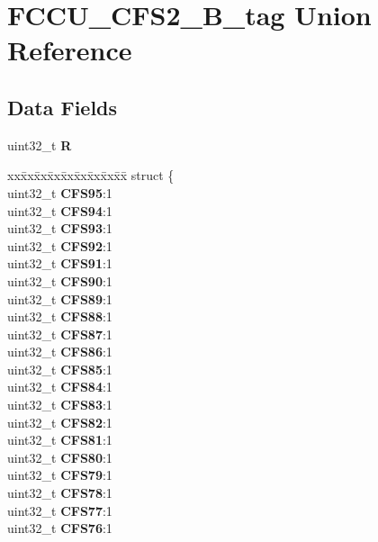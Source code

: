 \hypertarget{unionFCCU__CFS2__32B__tag}{}\section{F\+C\+C\+U\+\_\+\+C\+F\+S2\+\_\+B\+\_\+tag Union Reference}
\label{unionFCCU__CFS2__32B__tag}
\subsection*{Data Fields}
\begin{DoxyCompactItemize}
\item 
\mbox{\label{unionFCCU__CFS2__32B__tag_a33751eeab86018dc3710e349909c5fef}} 
uint32\+\_\+t {\bfseries R}
\item 
\mbox{\label{unionFCCU__CFS2__32B__tag_a234fdc9258a120998be7bef80231754e}} 
\begin{tabbing}
xx\=xx\=xx\=xx\=xx\=xx\=xx\=xx\=xx\=\kill
struct \{\\
\>uint32\_t {\bfseries CFS95}:1\\
\>uint32\_t {\bfseries CFS94}:1\\
\>uint32\_t {\bfseries CFS93}:1\\
\>uint32\_t {\bfseries CFS92}:1\\
\>uint32\_t {\bfseries CFS91}:1\\
\>uint32\_t {\bfseries CFS90}:1\\
\>uint32\_t {\bfseries CFS89}:1\\
\>uint32\_t {\bfseries CFS88}:1\\
\>uint32\_t {\bfseries CFS87}:1\\
\>uint32\_t {\bfseries CFS86}:1\\
\>uint32\_t {\bfseries CFS85}:1\\
\>uint32\_t {\bfseries CFS84}:1\\
\>uint32\_t {\bfseries CFS83}:1\\
\>uint32\_t {\bfseries CFS82}:1\\
\>uint32\_t {\bfseries CFS81}:1\\
\>uint32\_t {\bfseries CFS80}:1\\
\>uint32\_t {\bfseries CFS79}:1\\
\>uint32\_t {\bfseries CFS78}:1\\
\>uint32\_t {\bfseries CFS77}:1\\
\>uint32\_t {\bfseries CFS76}:1\\

\end{tabbing}
\end{DoxyCompactItemize}

